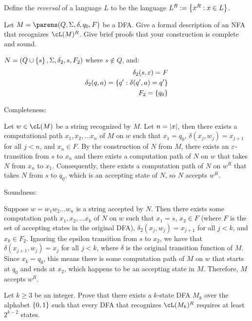 \begin{problem}
  Define the \emph{reversal} of a language $L$ to be the language
  $L^R := \left\{x^R : x \in L\right\}$.
  \begin{enumalph}
    \item Let $M = \parens(Q, \Sigma, \delta, q_0, F)$ be a DFA.
      Give a formal description of an NFA that recognizes $\cL(M)^R$.
      Give brief proofs that your construction is complete and sound.
    \begin{Answer}
      $N = (Q \cup \left\{ s\right\}, \Sigma, \delta_2, s, F_2)$ where $s \notin Q$, and:
      \begin{align*}
        \delta_2(s, \varepsilon) = F \\
        \delta_2(q, a) = \left\{q' : \delta(q', a) = q'\right\} \\
        F_2 = \left\{ q_0 \right\}
      \end{align*}

      \step
      Completeness:

      Let $w \in \cL(M)$ be a string recognized by $M$. Let $n = \lvert x\rvert$, then there
      exists a computational path $x_1, x_2, \ldots x_n$ of $M$ on $w$ such that
      $x_1 = q_0$, $\delta(x_j, w_j) = x_{j+1}$ for all $j < n$, and $x_n \in F$.
      By the construction of $N$ from $M$, there exists an $\varepsilon$-transition from
      $s$ to $x_n$ and there exists a computation path of $N$ on $w$ that takes
      $N$ from $x_n$ to $x_1$. Consequently, there exists a computation path of $N$
      on $w^R$ that takes $N$ from $s$ to $q_0$, which is an accepting state of $N$,
      so $N$ accepts $w^R$.

      \step
      Soundness:

      Suppose $w = w_1 w_2 \ldots w_n$ is a string accepted by $N$.
      Then there exists some computation path $x_1, x_2, \ldots x_k$ of $N$ on $w$
      such that $x_1 = s$, $x_2 \in F$ (where $F$ is the set of accepting states
      in the original DFA), $\delta_2(x_j, w_j) = x_{j+1}$ for all $j < k$, and
      $x_k \in F_2$. Ignoring the epsilon transition from $s$ to $x_2$,
      we have that $\delta(x_{j+1}, w_j) = x_j$ for all $j < k$,
      where $\delta$ is the original transition function of $M$.
      Since $x_k = q_0$, this means there is some computation path of $M$ on $w$
      that starts at $q_0$ and ends at $x_2$, which happens to be an accepting state
      in $M$. Therefore, $M$ accepts $w^R$.
    \end{Answer}

    \newpage
    \item Let $k \geq 3$ be an integer. Prove that there exists a $k$-state
      DFA $M_k$ over the alphabet $\left\{0, 1\right\}$ such that every DFA that
      recognizes $\cL(M_k)^R$ requires at least $2^{k-2}$ states.


\end{enumalph}
\end{problem}
